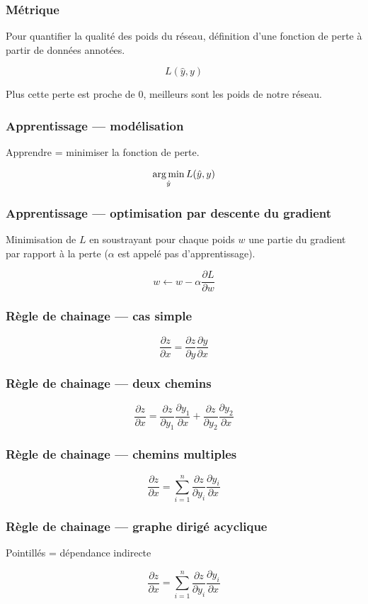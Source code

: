 \documentclass{formation}
\begin{document}
\begin{frame}
  \frametitle{Métrique}
  Pour quantifier la qualité des poids du réseau, définition d'une
  fonction de perte à partir de données annotées.

  \[
    L(\hat{y}, y)
  \]

  Plus cette perte est proche de 0, meilleurs sont les poids de notre
  réseau.
\end{frame}


\begin{frame}
  \frametitle{Apprentissage --- modélisation}
  Apprendre = minimiser la fonction de perte.

  \[
    \argmin_{\hat{y}}L(\hat{y}, y)
  \]
\end{frame}

\begin{frame}
  \frametitle{Apprentissage --- optimisation par descente du gradient}
  Minimisation de $L$ en soustrayant pour chaque poids $w$ une partie
  du gradient par rapport à la perte ($\alpha$ est appelé pas
  d'apprentissage).

  \[
    w \leftarrow w - \alpha \frac{\partial L}{\partial w}
  \]
  
\end{frame}

\begin{frame}
  \frametitle{Règle de chainage --- cas simple}

  \[
    \frac{\partial z}{\partial x} = \frac{\partial z}{\partial y}
    \frac{\partial y}{\partial x}
  \]
\end{frame}

\begin{frame}
  \frametitle{Règle de chainage --- deux chemins}

  \[
    \frac{\partial z}{\partial x} = \frac{\partial z}{\partial y_1}
    \frac{\partial y_1}{\partial x} + \frac{\partial z}{\partial y_2}
    \frac{\partial y_2}{\partial x}
  \]
\end{frame}

\begin{frame}
  \frametitle{Règle de chainage --- chemins multiples}

  \[
    \frac{\partial z}{\partial x} = \sum_{i = 1}^{n} \frac{\partial
      z}{\partial y_i} \frac{\partial y_i}{\partial x}
  \]
\end{frame}

\begin{frame}
  \frametitle{Règle de chainage --- graphe dirigé acyclique}

  Pointillés = dépendance indirecte

  \[
    \frac{\partial z}{\partial x} = \sum_{i = 1}^{n} \frac{\partial
      z}{\partial y_i} \frac{\partial y_i}{\partial x}
  \]
\end{frame}
\end{document}
